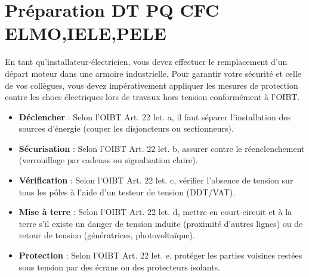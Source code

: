 \documentclass[a4paper,11pt,answers,addpoints]{exam}
\begin{document}
	\unframedsolutions
	\pointsinmargin
	\bracketedpoints
	
	\section*{Préparation DT PQ CFC ELMO,IELE,PELE}
	\begin{questions}
\question
En tant qu'installateur-électricien, vous devez effectuer le remplacement d'un départ moteur dans une armoire industrielle. Pour garantir votre sécurité et celle de vos collègues, vous devez impérativement appliquer les mesures de protection contre les chocs électriques lors de travaux hors tension conformément à l'OIBT.


\begin{solution}
	\begin{itemize}
		\item \textbf{Déclencher} : Selon l'OIBT Art. 22 let. a, il faut séparer l'installation des sources d'énergie (couper les disjoncteurs ou sectionneurs).
		\item \textbf{Sécurisation} : Selon l'OIBT Art. 22 let. b, assurer contre le réenclenchement (verrouillage par cadenas ou signalisation claire).
		\item \textbf{Vérification} : Selon l'OIBT Art. 22 let. c, vérifier l'absence de tension sur tous les pôles à l'aide d'un testeur de tension (DDT/VAT).
		\item \textbf{Mise à terre} : Selon l'OIBT Art. 22 let. d, mettre en court-circuit et à la terre s'il existe un danger de tension induite (proximité d'autres lignes) ou de retour de tension (génératrices, photovoltaïque).
		\item \textbf{Protection} : Selon l'OIBT Art. 22 let. e, protéger les parties voisines restées sous tension par des écrans ou des protecteurs isolants.
	\end{itemize}
	

\end{solution}
\end{questions}
\end{document}
